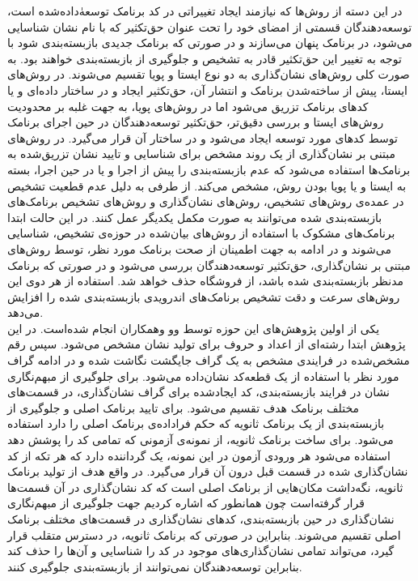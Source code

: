 در این دسته از روش‌ها که نیازمند ایجاد تغییراتی در کد برنامک توسعه‌ٰداده‌شده است، توسعه‌دهندگان قسمتی از امضا‌ی خود را تحت عنوان حق‌تکثیر‌ که با نام نشان شناسایی می‌شود، در برنامک پنهان می‌سازند و در صورتی که برنامک‌ جدیدی بازبسته‌بندی شود با توجه به تغییر این حق‌تکثیر قادر به تشخیص و جلوگیری از بازبسته‌بندی خواهند بود. به صورت کلی روش‌های نشان‌گذاری‌ به دو نوع ایستا و پویا تقسیم می‌شوند. در روش‌های ایستا، پیش از ساخته‌‌شدن برنامک و انتشار آن، حق‌تکثیر ایجاد و در ساختار داده‌ای و یا کد‌های برنامک تزریق می‌شود اما در روش‌های پویا، به جهت غلبه بر محدودیت روش‌های ایستا و بررسی دقیق‌تر،‌ حق‌تکثیر توسعه‌دهندگان در حین اجرای برنامک توسط کد‌های مورد توسعه ایجاد می‌شود و در ساختار آن قرار می‌گیرد. در روش‌های مبتنی بر نشان‌گذاری از یک روند مشخص برای شناسایی و تایید نشان تزریق‌شده به برنامک‌ها استفاده می‌شود که عدم بازبسته‌بندی را پیش از اجرا و یا در حین اجرا، بسته به ایستا و یا پویا بودن روش، مشخص می‌کند. از طرفی به دلیل عدم قطعیت تشخیص در عمده‌ی روش‌های تشخیص، روش‌های نشان‌گذاری و روش‌های تشخیص برنامک‌‌های بازبسته‌بندی شده می‌توانند به صورت مکمل یکدیگر عمل کنند.  در این حالت ابتدا برنامک‌های مشکوک با استفاده از روش‌های بیان‌شده در حوزه‌ی تشخیص، شناسایی می‌شوند و در ادامه به جهت اطمینان از صحت برنامک مورد نظر، توسط روش‌های مبتنی بر نشان‌گذاری، حق‌تکثیر توسعه‌دهندگان بررسی می‌شود و در صورتی که برنامک مدنظر بازبسته‌بندی شده باشد، از فروشگاه حذف خواهد شد. استفاده از هر دوی این روش‌های سرعت و دقت تشخیص برنامک‌های اندرویدی بازبسته‌بندی شده را افزایش می‌دهد.
\\
یکی از اولین پژوهش‌های این حوزه توسط وو وهمکاران انجام شده‌است. در این پژوهش ابتدا رشته‌ای از اعداد و حروف برای تولید نشان‌ مشخص می‌شود. سپس رقم مشخص‌شده در فرایندی مشخص به یک گراف جایگشت نگاشت شده و در ادامه گراف مورد نظر با استفاده از یک قطعه‌کد نشان‌داده می‌شود. برای جلوگیری از مبهم‌نگاری نشان در فرایند بازبسته‌بندی، کد ایجاد‌شده برای گراف‌ نشان‌گذاری، در قسمت‌های مختلف برنامک هدف تقسیم می‌شود. برای تایید برنامک اصلی و جلوگیری از بازبسته‌بندی از یک برنامک ثانویه که حکم فراداده‌ی برنامک اصلی را دارد استفاده می‌شود. برای ساخت برنامک ثانویه، از نمونه‌ی آزمونی که تمامی کد را پوشش دهد استفاده می‌شود هر ورودی آزمون در این نمونه، یک گرداننده دارد که هر تکه از کد نشان‌گذاری شده در قسمت قبل درون آن قرار می‌گیرد. در واقع هدف از تولید برنامک ثانویه، نگه‌داشت مکان‌هایی از برنامک اصلی است که کد نشان‌گذاری در آن قسمت‌ها قرار گرفته‌است چون همانطور که اشاره کردیم جهت جلوگیری از مبهم‌نگاری نشان‌گذاری در حین بازبسته‌بندی، کد‌های نشان‌گذاری در قسمت‌های مختلف برنامک اصلی تقسیم می‌شوند. بنابراین در صورتی که برنامک ثانویه، در دسترس متقلب قرار گیرد، می‌تواند تمامی نشان‌گذاری‌های موجود در کد را شناسایی و آن‌ها را حذف کند بنابراین توسعه‌دهندگان نمی‌توانند از بازبسته‌بندی جلوگیری کنند.\\

